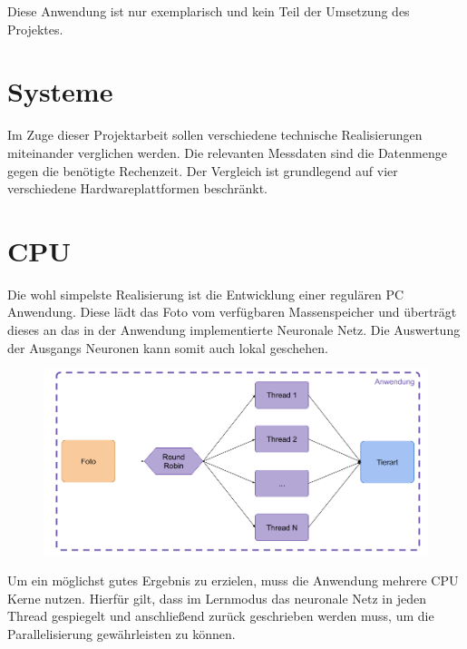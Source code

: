 Diese Anwendung ist nur exemplarisch und kein Teil der Umsetzung des Projektes.

\newpage


\section*{\LARGE\textbf{Systeme}}

Im Zuge dieser Projektarbeit sollen verschiedene technische Realisierungen miteinander verglichen werden. Die relevanten Messdaten sind die Datenmenge gegen die benötigte Rechenzeit. Der Vergleich ist grundlegend auf vier verschiedene Hardwareplattformen beschränkt.



\section*{\LARGE\textbf{CPU}}

Die wohl simpelste Realisierung ist die Entwicklung einer regulären PC Anwendung. Diese lädt das Foto vom verfügbaren Massenspeicher und überträgt dieses an das in der Anwendung implementierte Neuronale Netz. Die Auswertung der Ausgangs Neuronen kann somit auch lokal geschehen. 

\begin{figure}[htbp]
	\centering
		\includegraphics[width=1.00\textwidth]{BilderPDF/zielsetzung/System-PC.png}
	\label{fig:System-PC}
\end{figure}

Um ein möglichst gutes Ergebnis zu erzielen, muss die Anwendung mehrere CPU Kerne nutzen. Hierfür gilt, dass im Lernmodus das neuronale Netz in jeden Thread gespiegelt und anschließend zurück geschrieben werden muss, um die Parallelisierung gewährleisten zu können.\\

